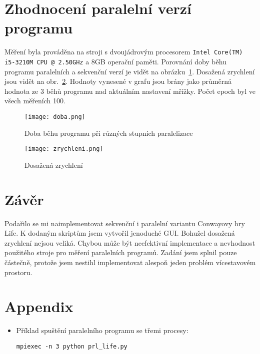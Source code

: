 \documentclass[12pt]{article}
\begin{document}
\section{Zhodnocení paralelní verzí programu}
\label{porov}

Měření byla prováděna na stroji s dvoujádrovým procesorem \texttt{Intel Core(TM) i5-3210M CPU @ 2.50GHz} a 8GB operační paměti. Porovnání doby běhu programu paralelních a sekvenční verzí je vidět na obrázku~\ref{doba}. Dosažená zrychlení jsou vidět na obr.~\ref{zrychleni}. Hodnoty vynesené v grafu jsou brány jako průměrná hodnota ze 3 běhů programu nad aktuálním nastavení mřížky. Počet epoch byl ve všech měřeních 100.

\begin{figure}
    \centering
    \texttt{[image: doba.png]}
    \caption{Doba běhu programu při různých stupních paralelizace}
    \label{doba}
\end{figure}

\begin{figure}
    \centering
    \texttt{[image: zrychleni.png]}
    \caption{Dosažená zrychlení}
    \label{zrychleni}
\end{figure}

\section{Závěr}

Podařilo se mi naimplementovat sekvenční i paralelní variantu Conwayovy hry Life. K dodaným skriptům jsem vytvořil jenoduché GUI. Bohužel dosažená zrychlení nejsou veliká. Chybou může být neefektivní implementace a nevhodnost použitého stroje pro měření paralelních programů. Zadání jsem splnil pouze částečně, protože jsem nestihl implementovat alespoň jeden problém vícestavovém prostoru.

\newpage
\section*{Appendix}
\begin{itemize}
\item Příklad spuštění paralelního programu se třemi procesy:
\begin{verbatim}
mpiexec -n 3 python prl_life.py 
\end{verbatim}
\end{itemize}
\end{document}
